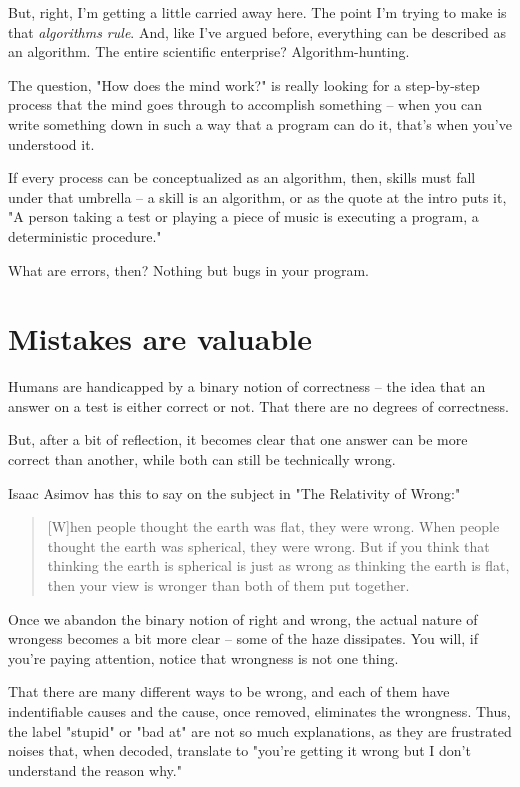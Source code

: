 But, right, I'm getting a little carried away here. The point I'm trying to make
is that \textit{algorithms rule}. And, like I've argued before, everything can be
described as an algorithm. The entire scientific enterprise? Algorithm-hunting.

The question, "How does the mind work?" is really looking for a step-by-step
process that the mind goes through to accomplish something -- when you can write
something down in such a way that a program can do it, that's when you've
understood it.

If every process can be conceptualized as an algorithm, then, skills must fall
under that umbrella -- a skill is an algorithm, or as the quote at the intro
puts it, "A person taking a test or playing a piece of music is executing a
program, a deterministic procedure."

What are errors, then? Nothing but bugs in your program.

\section{Mistakes are valuable}

Humans are handicapped by a binary notion of correctness -- the idea that an
answer on a test is either correct or not. That there are no degrees of
correctness.

But, after a bit of reflection, it becomes clear that one answer can be more
correct than another, while both can still be technically wrong.

Isaac Asimov has this to say on the subject in "The Relativity of Wrong:"

\begin{quote}
[W]hen people thought the earth was flat, they were wrong. When people thought
the earth was spherical, they were wrong. But if you think that thinking the
earth is spherical is just as wrong as thinking the earth is flat, then your
view is wronger than both of them put together.
\end{quote}
  
Once we abandon the binary notion of right and wrong, the actual nature of
wrongess becomes a bit more clear -- some of the haze dissipates. You will, if
you're paying attention, notice that wrongness is not one thing.

That there are many different ways to be wrong, and each of them have
indentifiable causes and the cause, once removed, eliminates the
wrongness. Thus, the label "stupid" or "bad at" are not so much explanations, as
they are frustrated noises that, when decoded, translate to "you're getting it
wrong but I don't understand the reason why."

